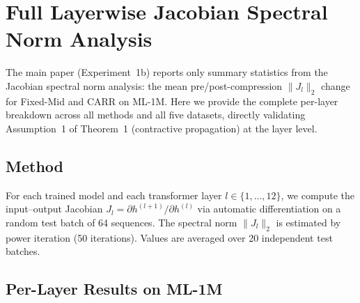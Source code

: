 \documentclass[letterpaper,10pt]{article}
\begin{document}
\section{Full Layerwise Jacobian Spectral Norm Analysis}
\label{sec:supp-jacobian}

The main paper (Experiment~1b) reports only summary statistics from the Jacobian spectral norm analysis: the mean pre/post-compression $\|J_l\|_2$ change for Fixed-Mid and CARR on ML-1M. Here we provide the complete per-layer breakdown across all methods and all five datasets, directly validating Assumption~1 of Theorem~1 (contractive propagation) at the layer level.

\subsection{Method}

For each trained model and each transformer layer $l \in \{1,\ldots,12\}$, we compute the input--output Jacobian $J_l = \partial h^{(l+1)}/\partial h^{(l)}$ via automatic differentiation on a random test batch of 64 sequences. The spectral norm $\|J_l\|_2$ is estimated by power iteration (50 iterations). Values are averaged over 20 independent test batches.

\subsection{Per-Layer Results on ML-1M}

\begin{table}[h!]
\centering
\caption{Layerwise Jacobian Spectral Norm $\|J_l\|_2$ on ML-1M. Compression boundaries are marked $\downarrow$.\label{tab:supp-jacobian-mlm}}
\end{table}
\end{document}
